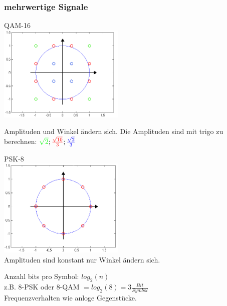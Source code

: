 \subsubsection{mehrwertige Signale}
\begin{multicols}{2}
    \begin{center}
	QAM-16\\
	\includegraphics[width=6cm]{bilder/qam_16.png}\\
	\end{center}
	Amplituden und Winkel ändern sich.
	Die Amplituden sind mit trigo zu berechnen:
	$\textcolor{green}{\sqrt{2}}; \textcolor{red}{\frac{\sqrt{10}}{3}}; \textcolor{blue}{\frac{\sqrt{2}}{3}}$
	\columnbreak

    \begin{center}
	PSK-8\\
	\includegraphics[width=6cm]{bilder/psk_8.png}\\
	Amplituden sind konstant nur Winkel ändern sich.
	\end{center} 

\end{multicols}
	Anzahl bits pro Symbol: $log_2\left(n\right)$\\
	z.B. 8-PSK oder 8-QAM $= log_2(8) = 3 \frac{Bit}{Symbol}$\\
	Frequenzverhalten wie anloge Gegenstücke.
